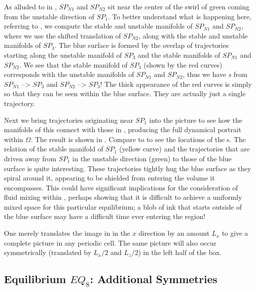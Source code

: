 \documentclass[letter,12pt,openany]{article}
\begin{document}
As alluded to in , $SP_{N1}$ and $SP_{N2}$ 
sit near the center of the swirl of green coming from the unstable 
direction of $SP_1$. To better understand what is happening here, 
referring to , we compute the  stable and 
unstable manifolds of $SP_{N1}$ and $SP_{N2}$, where we use the shifted 
translation of $SP_{N2}$, along with the stable and unstable manifolds of 
$SP_3$. The blue surface is formed by the overlap of trajectories 
starting along the unstable manifold of $SP_3$ and the stable manifolds 
of $SP_{N1}$ and $SP_{N2}$.  We see that the stable manifold of $SP_3$ 
(shown by the red curves) corresponds with the unstable manifolds of 
$SP_{N1}$ and $SP_{N2}$, thus we have \textit{{\hc}s} from $SP_{N1}$ --> 
$SP_3$ and $SP_{N2}$ --> $SP_3$! The thick appearance of the red curves 
is simply so that they can be seen within the blue surface. They are 
actually just a single trajectory. 
 
Next we bring trajectories originating near $SP_1$ into the picture to 
see how the manifolds of this {\stagp} connect with those in 
, producing the full dynamical portrait within 
$\Omega$.  The result is shown in . Compare to 
 to see the locations of the {\stagp}s. 
The relation of the stable manifold of $SP_1$ (yellow curve) and the 
trajectories that are driven away from $SP_1$ in the unstable direction 
(green) to those of the blue surface is quite interesting. These 
trajectories tightly hug the blue surface as they spiral around it, 
appearing to be shielded from entering the volume it encompasses. This 
could have significant implications for the consideration of fluid mixing 
within {\pCf}, perhaps showing that it is difficult to achieve a 
uniformly mixed space for this particular equilibrium; a blob of ink that 
starts outside of the blue surface may have a difficult time ever 
entering the region! 
 
One merely translates the image in  in the $x$ 
direction by an amount $L_{x}$ to give a complete picture in any periodic 
cell. The same picture will also occur symmetrically (translated by 
$L_{x}/2$ and $L_{z}/2$) in the left half of the box. 


\subsection{Equilibrium $EQ_8$: Additional Symmetries}
\label{sect:EQ8}
\end{document}
